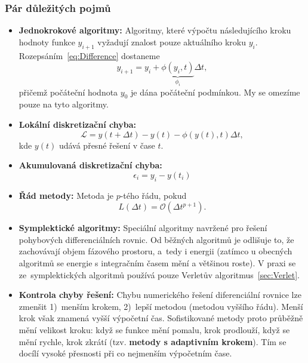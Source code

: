 \documentclass[a4paper,11pt,twoside]{article}
\begin{document}
    \subsubsection{Pár důležitých pojmů}
    \begin{itemize}
        \item {\bf Jednokrokové algoritmy:}
        Algoritmy, které výpočtu následujícího kroku hodnoty funkce $y_{i+1}$ vyžadují znalost pouze aktuálního kroku $y_{i}$.
        Rozepsáním~\eqref{eq:Difference} dostaneme
        \begin{equation}
            \boxed{
                y_{i+1}=y_{i}+\underbrace{\phi(y_{i},t)}_{\phi_{i}}\Delta t
            },
        \end{equation}
        přičemž počáteční hodnota $y_{0}$ je dána počáteční podmínkou.
        My se omezíme pouze na tyto algoritmy.

        \item {\bf Lokální diskretizační chyba:}
        \begin{equation}
            \mathcal{L}=y(t+\Delta t)-y(t)-\phi(y(t),t)\Delta t,
        \end{equation}        
        kde $y(t)$ udává přesné řešení v čase $t$.

        \item {\bf Akumulovaná diskretizační chyba:}
        \begin{equation}
            \epsilon_{i}=y_{i}-y(t_{i})
        \end{equation}

        \item {\bf Řád metody:} 
        Metoda je $p$-tého řádu, pokud
        \begin{equation}\label{eq:MethodOrder}
            L(\Delta t)=\mathcal{O}(\Delta t^{p+1}).
        \end{equation}

        \item {\bf Symplektické algoritmy:}
        Speciální algoritmy navržené pro řešení pohybových differenciálních rovnic.
        Od běžných algoritmů je odlišuje to, že zachovávají objem fázového prostoru, a~tedy i energii (zatímco u obecných algoritmů se energie s integračním časem mění a většinou roste).
        V praxi se ze~symplektických algoritmů používá pouze Verletův algoritmus~\ref{sec:Verlet}.

        \item {\bf Kontrola chyby řešení:}
        Chybu numerického řešení diferenciální rovnice lze zmenšit 1)~menším krokem, 2)~lepší metodou (metodou vyššího řádu). 
        Menší krok však znamená vyšší výpočetní čas.
        Sofistikované metody proto průběžně mění velikost kroku: když se funkce mění pomalu, krok prodlouží, když se mění rychle, krok zkrátí (tzv. {\bf metody s adaptivním krokem}).
        Tím se docílí vysoké přesnosti při co nejmenším výpočetním čase.

    \end{itemize}
\end{document}
